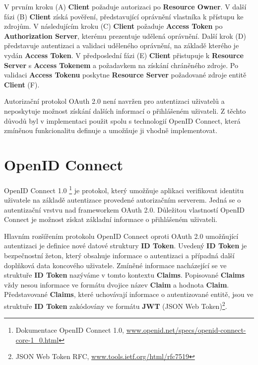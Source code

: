 \documentclass[
  printed, %
  twoside, %
  table,   %
  nolof,     %
  nolot,     %
]{fithesis3}
\begin{document}
V prvním kroku (A) \textbf{Client} požaduje autorizaci po \textbf{Resource Owner}. V další fázi (B) \textbf{Client} získá pověření, představující oprávnění vlastníka k přístupu ke zdrojům. V následujícím kroku (C) \textbf{Client} požaduje \textbf{Access Token} po \textbf{Authorization Server}, kterému prezentuje udělená oprávnění. Další krok (D) představuje autentizaci a validaci uděleného oprávnění, na základě kterého je vydán \textbf{Access Token}. V předposlední fázi (E) \textbf{Client} přistupuje k \textbf{Resource Server} s \textbf{Access Tokenem} a požadavkem na získání chráněného zdroje. Po validaci \textbf{Access Tokenu} poskytne \textbf{Resource Server} požadované zdroje entitě \textbf{Client} (F). \par 

Autorizační protokol OAuth 2.0 není navržen pro autentizaci uživatelů a neposkytuje možnost získání dalších informací o přihlášeném uživateli. Z těchto důvodů byl v implementaci použit spolu s technologií OpenID Connect, která zmíněnou funkcionalitu definuje a umožňuje ji vhodně implementovat. 

\section{OpenID Connect}
\label{sec:oidc}
OpenID Connect 1.0 \footnote{Dokumentace OpenID Connect 1.0, \url{www.openid.net/specs/openid-connect-core-1_0.html}} je protokol, který umožňuje aplikaci verifikovat identitu uživatele na základě autentizace provedené autorizačním serverem. Jedná se o autentizační vrstvu nad frameworkem OAuth 2.0. Důležitou vlastností OpenID Connect je možnost získat základní informace o přihlášeném uživateli. \par

Hlavním rozšířením protokolu OpenID Connect oproti OAuth 2.0 umožňující autentizaci je definice nové datové struktury \textbf{ID Token}. Uvedený \textbf{ID Token} je bezpečnostní žeton, který obsahuje informace o autentizaci a případná další doplňková data koncového uživatele. Zmíněné informace nacházející se ve struktuře \textbf{ID Token} nazýváme v tomto kontextu \textbf{Claims}. Popisované \textbf{Claims} vždy nesou informace ve formátu dvojice název \textbf{Claim} a hodnota \textbf{Claim}. Představované \textbf{Claims}, které uchovávají informace o autentizované entitě, jsou ve struktuře \textbf{ID Token} zakódovány ve formátu \textbf{JWT} (JSON Web Token)\footnote{JSON Web Token RFC, \url{www.tools.ietf.org/html/rfc7519}}.    \par
\end{document}
